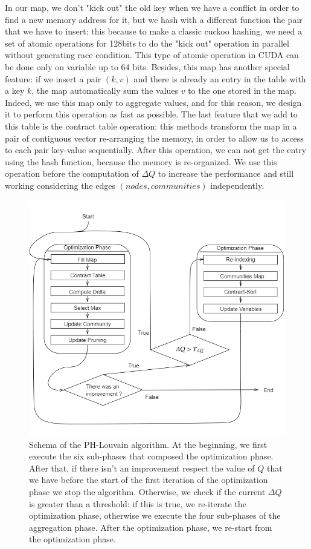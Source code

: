 In our map, we don't "kick out" the old key when we have a conflict in order to find a new memory address for it, but we hash with a different function the pair that we have to insert: this because to make a classic cuckoo hashing, we need a set of atomic operations for 128bits to do the "kick out" operation in parallel without generating race condition. This type of atomic operation in CUDA can be done only on variable up to 64 bits. Besides, this map has another special feature: if we insert a pair $(k,v)$ and there is already an entry in the table with a key $k$, the map automatically sum the values $v$ to the one stored in the map. Indeed, we use this map only to aggregate values, and for this reason, we design it to perform this operation as fast as possible. The last feature that we add to this table is the contract table operation: this methods transform the map in a pair of contiguous vector re-arranging the memory, in order to allow us to access to each pair key-value sequentially. After this operation, we can not get the entry using the hash function, because the memory is re-organized. We use this operation before the computation of $\Delta Q$ to increase the performance and still working considering the edges $(nodes, communities)$ independently. 
\begin{figure}[t!]
	\centering
	\includegraphics[width=1\linewidth]{0-resources/PH-Louvain}
	\caption{Schema of the PH-Louvain algorithm. At the beginning, we first execute the six sub-phases that composed the optimization phase. After that, if there isn't an improvement respect the value of $Q$ that we have before the start of the first iteration of the optimization phase we stop the algorithm. Otherwise, we check if the current $\Delta Q$ is greater than a threshold: if this is true, we re-iterate the optimization phase, otherwise we execute the four sub-phases of the aggregation phase. After the optimization phase, we re-start from the optimization phase.}
	\label{fig:ph-louvain}
\end{figure}
